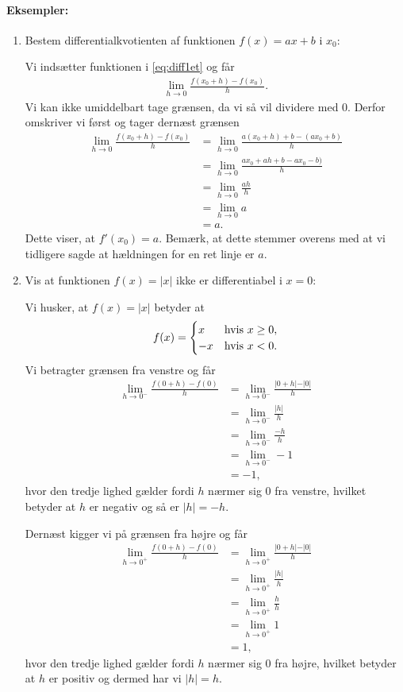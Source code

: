 \paragraph*{Eksempler:}
\begin{enumerate}
\item Bestem differentialkvotienten af funktionen $f(x)=ax+b$ i $x_0$:

Vi indsætter funktionen i \eqref{eq:diff1et} og får
\begin{align*}
\lim_{h \to 0} \frac{f(x_0+h)-f(x_0)}{h}.
\end{align*}
Vi kan ikke umiddelbart tage grænsen, da vi så vil dividere med $0$. Derfor omskriver vi først og tager dernæst grænsen
\begin{align*}
\lim_{h \to 0} \frac{f(x_0+h)-f(x_0)}{h} &= \lim_{h \to 0} \frac{a(x_0+h)+b-(ax_0+b)}{h}\\
&= \lim_{h \to 0} \frac{ax_0+ah+b-ax_0-b)}{h} \\
&= \lim_{h \to 0} \frac{ah}{h} \\
&= \lim_{h \to 0} a \\
&= a.
\end{align*}
Dette viser, at $f'(x_0)=a$. Bemærk, at dette stemmer overens med at vi tidligere sagde at hældningen for en ret linje er $a$.
\item Vis at funktionen $f(x)=\vert x \vert$ ikke er differentiabel i $x=0$:

Vi husker, at $f(x)=\vert x \vert$ betyder at
\begin{align*}
f(x) = \begin{cases}
x & \textup{hvis } x \geq 0, \\
-x & \textup{hvis } x <0.
\end{cases}
\end{align*}
Vi betragter grænsen fra venstre og får
\begin{align*}
\lim_{h \to 0^-} \frac{f(0+h)-f(0)}{h} &= \lim_{h \to 0^-} \frac{\vert 0 + h \vert - \vert 0 \vert}{h} \\
&= \lim_{h \to 0^-} \frac{\vert h \vert}{h} \\
&= \lim_{h \to 0^-} \frac{-h}{h} \\
&= \lim_{h \to 0^-} -1 \\
&= -1,
\end{align*}
hvor den tredje lighed gælder fordi $h$ nærmer sig $0$ fra venstre, hvilket betyder at $h$ er negativ og så er $\vert h \vert = -h$.

Dernæst kigger vi på grænsen fra højre og får
\begin{align*}
\lim_{h \to 0^+} \frac{f(0+h)-f(0)}{h} &= \lim_{h \to 0^+} \frac{\vert 0 + h \vert - \vert 0 \vert}{h} \\
&= \lim_{h \to 0^+} \frac{\vert h \vert}{h} \\
&= \lim_{h \to 0^+} \frac{h}{h} \\
&= \lim_{h \to 0^+} 1 \\
&= 1,
\end{align*}
hvor den tredje lighed gælder fordi $h$ nærmer sig $0$ fra højre, hvilket betyder at $h$ er positiv og dermed har vi $\vert h \vert =h$.


\end{enumerate}
